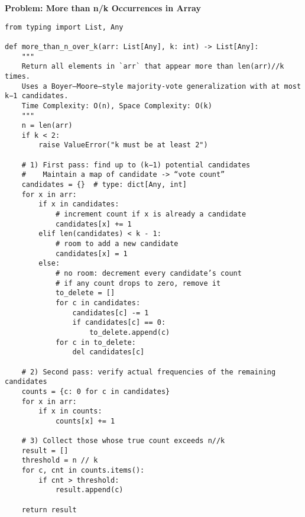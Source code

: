 \noindent\textbf{Problem: More than n/k Occurrences in Array}
\begin{verbatim}
from typing import List, Any

def more_than_n_over_k(arr: List[Any], k: int) -> List[Any]:
    """
    Return all elements in `arr` that appear more than len(arr)//k times.
    Uses a Boyer–Moore–style majority‐vote generalization with at most k−1 candidates.
    Time Complexity: O(n), Space Complexity: O(k)
    """
    n = len(arr)
    if k < 2:
        raise ValueError("k must be at least 2")

    # 1) First pass: find up to (k−1) potential candidates
    #    Maintain a map of candidate -> “vote count”
    candidates = {}  # type: dict[Any, int]
    for x in arr:
        if x in candidates:
            # increment count if x is already a candidate
            candidates[x] += 1
        elif len(candidates) < k - 1:
            # room to add a new candidate
            candidates[x] = 1
        else:
            # no room: decrement every candidate’s count
            # if any count drops to zero, remove it
            to_delete = []
            for c in candidates:
                candidates[c] -= 1
                if candidates[c] == 0:
                    to_delete.append(c)
            for c in to_delete:
                del candidates[c]

    # 2) Second pass: verify actual frequencies of the remaining candidates
    counts = {c: 0 for c in candidates}
    for x in arr:
        if x in counts:
            counts[x] += 1

    # 3) Collect those whose true count exceeds n//k
    result = []
    threshold = n // k
    for c, cnt in counts.items():
        if cnt > threshold:
            result.append(c)

    return result
\end{verbatim}
% 
